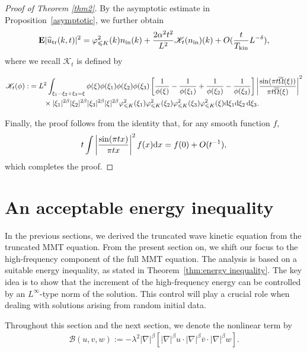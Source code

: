 \documentclass[UTF-8,reqno]{amsart}
\numberwithin{equation}{section}
\theoremstyle{definition}
\def\dif{{\mathord{{\rm d}}}}
\def\leq{\leqslant}
\def\dif{{\mathord{{\rm d}}}}
\def\leq{\leqslant}
\begin{document}
\begin{proof}[Proof of Theorem \ref{thm2}]
By the asymptotic estimate in Proposition~\ref{asymptotic}, we further obtain \begin{align*}\mathbf{E}|\widehat{u}_{\rm tr}(k,t)|^2=\varphi_{\leq K}^2(k)n_{\mathrm{in}}(k)+\frac{2\alpha^2t^2}{L^{2}}\mathscr{K}_{t}(n_{\mathrm{in}})(k)+O(\frac{t}{T_{\rm kin}}L^{-\delta}),\end{align*}
 where we recall $\mathscr K_t$ is defined by 

\begin{align*}
\mathscr K_t(\phi):&=L^{2} \int_{\xi_1-\xi_2+\xi_3=\xi }\phi(\xi) \phi(\xi_1) \phi(\xi_2) \phi(\xi_3)  \left[ \frac{1}{\phi(\xi)} - \frac{1}{\phi(\xi_1)} + \frac{1}{\phi(\xi_2)} - \frac{1}{\phi(\xi_3)} \right]    \left| \frac{\sin(\pi t\overline \Omega( \xi))}{\pi t\overline\Omega( \xi)} \right|^2 \notag\\ &\quad\quad\times |\xi_1|^{2\beta}|\xi_2|^{2\beta}|\xi_3|^{2\beta}|\xi|^{2\beta}\varphi_{\leq K}^2(\xi_1)\varphi_{\leq K}^2(\xi_2)\varphi_{\leq K}^2(\xi_3)\varphi_{\leq K}^2(\xi)   \dif \xi_1  \dif\xi_2 \, \dif\xi_3.
\end{align*}

Finally, the proof follows from the identity that, for any smooth function $f$,
\begin{align*}
t \int \left| \frac{\sin(\pi t x)}{\pi t x} \right|^2 f(x)\dif x =  f(0) + O(t^{-1}),
\end{align*}
which completes the proof.
\end{proof}




\section{An acceptable energy inequality}\label{sec:acceptineq}
In the previous sections, we derived the truncated wave kinetic equation   from the truncated MMT equation. 
From the present section on, we shift our focus to the high-frequency component of the full MMT equation.
The analysis is based on a suitable energy inequality, as stated in Theorem~\ref{thm:energy inequality}. 
The key idea is to show that the increment of the high-frequency energy can be controlled by an $L^\infty$-type norm of the solution. 
This control will play a crucial role when dealing with solutions arising from random initial data.
 

 
Throughout this section and the next section, we denote the nonlinear term  by 
\begin{align*}
    \mathscr{B}(u,v,w):= -\lambda^2 |\nabla|^\beta\left[|\nabla|^\beta u \cdot|\nabla|^\beta\overline v   \cdot|\nabla|^\beta w\right].
\end{align*}
\end{document}
